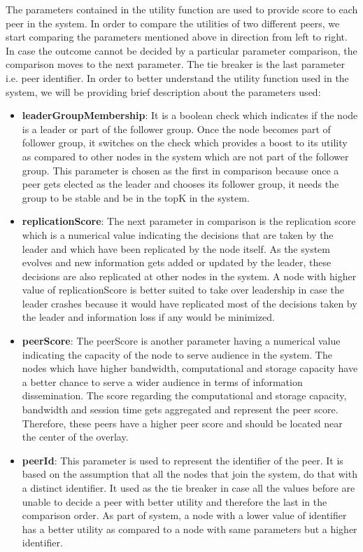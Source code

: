 \documentclass[a4paper,11pt]{kth-mag}
\begin{document}
The parameters contained in the utility function are used to provide score to each peer in the system. In order to compare the utilities of two different peers, we start comparing the parameters mentioned above in direction from left to right. In case the outcome cannot be decided by a particular parameter comparison, the comparison moves to the next parameter. The tie breaker is the last parameter i.e. peer identifier. In order to better understand the utility function used in the system, we will be providing brief description about the parameters used:

\begin{itemize}


\item \textbf{leaderGroupMembership}: It is a boolean check which indicates if the node is a leader or part of the follower group. Once the node becomes part of follower group, it switches on the check which provides a boost to its utility as compared to other nodes in the system which are not part of the follower group. This parameter is chosen as the first in comparison because once a peer gets elected as the leader and chooses its follower group, it needs the group to be stable and be in the topK in the system.


\item \textbf{replicationScore}: The next parameter in comparison is the replication score which is a numerical value indicating the decisions that are taken by the leader and which have been replicated by the node itself. As the system evolves and new information gets added or updated by the leader, these decisions are also replicated at other nodes in the system. A node with higher value of replicationScore is better suited to take  over leadership in case the leader crashes because it would have replicated most of the decisions taken by the leader and information loss if any would be minimized.

\item \textbf{peerScore}: The peerScore is another parameter having a numerical value indicating the capacity of the node to serve audience in the system. The nodes which have higher bandwidth, computational and storage capacity have a better chance to serve a wider audience in terms of information dissemination. The score regarding the computational and storage capacity, bandwidth and session time gets aggregated and represent the peer score. Therefore, these peers have a higher peer score and should be located near the center of the overlay.


\item \textbf{peerId}: This parameter is used to represent the identifier of the peer.  It is based on the assumption that all the nodes that join the system, do that with a distinct identifier. It used as the tie breaker in case all the values before are unable to decide a peer with better utility and therefore the last in the comparison order. As part of system, a node with a lower value of identifier has a better utility as compared to a node with same parameters but a higher identifier.

\end{itemize}
\end{document}
